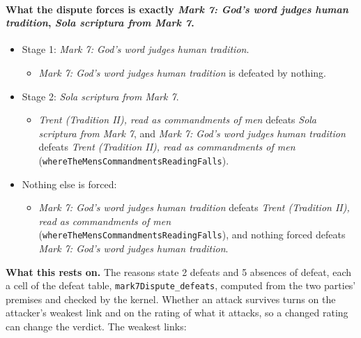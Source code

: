 \documentclass[11pt]{article}
\begin{document}
\paragraph{What the dispute forces is exactly \emph{Mark 7: God's word judges human tradition}, \emph{Sola scriptura from Mark 7}.}
\begin{itemize}
\item Stage 1: \emph{Mark 7: God's word judges human tradition}.
\begin{itemize}
\item \emph{Mark 7: God's word judges human tradition} is defeated by nothing.
\end{itemize}
\item Stage 2: \emph{Sola scriptura from Mark 7}.
\begin{itemize}
\item \emph{Trent (Tradition II), read as commandments of men} defeats \emph{Sola scriptura from Mark 7}, and \emph{Mark 7: God's word judges human tradition} defeats \emph{Trent (Tradition II), read as commandments of men} (\texttt{where\allowbreak{}The\allowbreak{}Mens\allowbreak{}Commandments\allowbreak{}Reading\allowbreak{}Falls}).
\end{itemize}
\item Nothing else is forced:
\begin{itemize}
\item \emph{Mark 7: God's word judges human tradition} defeats \emph{Trent (Tradition II), read as commandments of men} (\texttt{where\allowbreak{}The\allowbreak{}Mens\allowbreak{}Commandments\allowbreak{}Reading\allowbreak{}Falls}), and nothing forced defeats \emph{Mark 7: God's word judges human tradition}.
\end{itemize}
\end{itemize}
\par\noindent\textbf{What this rests on.} The reasons state 2 defeats and 5 absences of defeat, each a cell of the defeat table, \texttt{mark7\allowbreak{}Dispute\_\allowbreak{}defeats}, computed from the two parties' premises and checked by the kernel. Whether an attack survives turns on the attacker's weakest link and on the rating of what it attacks, so a changed rating can change the verdict. The weakest links:
\end{document}

